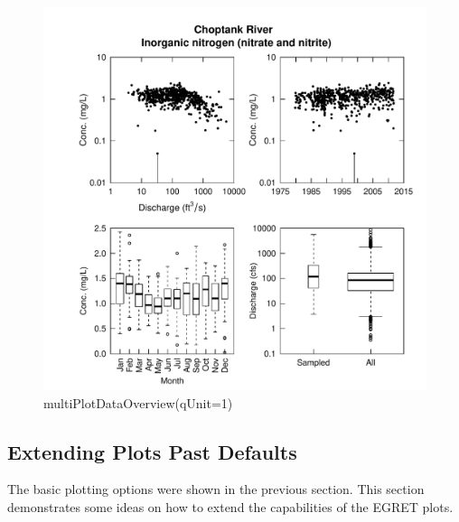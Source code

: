 \documentclass[a4paper,11pt]{article}\usepackage{graphicx, color}
\newenvironment{knitrout}{}{} %
\begin{document}
\begin{knitrout}
\color{fgcolor}\begin{figure}[]

\includegraphics[width=1\linewidth,height=1\linewidth]{figure/multiPlotDataOverview} \caption[multiPlotDataOverview(qUnit=1)]{multiPlotDataOverview(qUnit=1)\label{fig:multiPlotDataOverview}}
\end{figure}


\end{knitrout}


\FloatBarrier

\subsection{Extending Plots Past Defaults}
\label{sec:extendedPlots}
The basic plotting options were shown in the previous section.  This section demonstrates some ideas on how to extend the capabilities of the EGRET plots.
\end{document}
